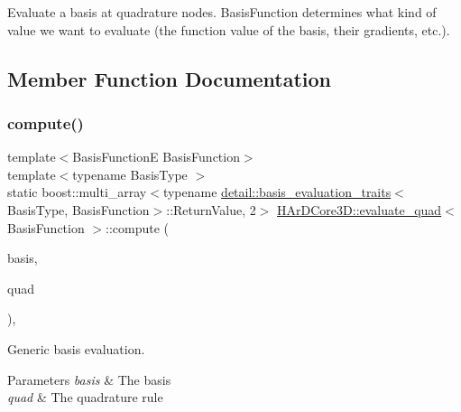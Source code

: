 Evaluate a basis at quadrature nodes. \textquotesingle{}Basis\+Function\textquotesingle{} determines what kind of value we want to evaluate (the function value of the basis, their gradients, etc.). 

\subsection{Member Function Documentation}
\mbox{\label{structHArDCore3D_1_1evaluate__quad_a1abe06df2a8a25ad4de2f738930ec143}} 
\subsubsection{\texorpdfstring{compute()}{compute()}\hspace{0.1cm}{\footnotesize\ttfamily [1/2]}}
{\footnotesize\ttfamily template$<$Basis\+FunctionE Basis\+Function$>$ \\
template$<$typename Basis\+Type $>$ \\
static boost\+::multi\+\_\+array$<$typename \hyperlink{structHArDCore3D_1_1detail_1_1basis__evaluation__traits}{detail\+::basis\+\_\+evaluation\+\_\+traits}$<$Basis\+Type, Basis\+Function$>$\+::Return\+Value, 2$>$ \hyperlink{structHArDCore3D_1_1evaluate__quad}{H\+Ar\+D\+Core3\+D\+::evaluate\+\_\+quad}$<$ Basis\+Function $>$\+::compute (\begin{DoxyParamCaption}\item[{const Basis\+Type \&}]{basis,  }\item[{const Quadrature\+Rule \&}]{quad }\end{DoxyParamCaption})\hspace{0.3cm}{\ttfamily [inline]}, {\ttfamily [static]}}



Generic basis evaluation. 


\begin{DoxyParams}{Parameters}
{\em basis} & The basis \\
\hline
{\em quad} & The quadrature rule \\
\hline
\end{DoxyParams}
\mbox{\label{structHArDCore3D_1_1evaluate__quad_aa1df24802a0b4781d1c7e8203f772a52}} 

